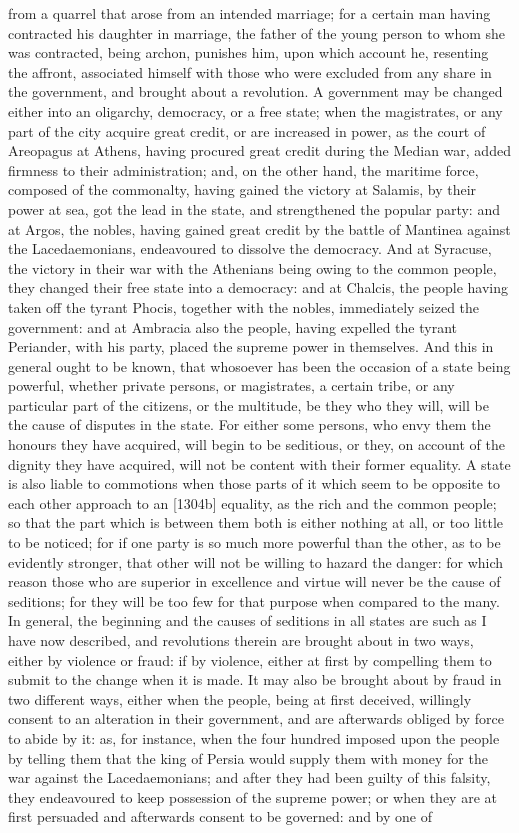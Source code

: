 \documentclass[12pt]{article}
\begin{document}
from a quarrel that arose from an intended marriage; for a certain man having contracted his daughter in marriage, the father of the young person to whom she was contracted, being archon, punishes him, upon which account he, resenting the affront, associated himself with those who were excluded from any share in the government, and brought about a revolution. A government may be changed either into an oligarchy, democracy, or a free state; when the magistrates, or any part of the city acquire great credit, or are increased in power, as the court of Areopagus at Athens, having procured great credit during the Median war, added firmness to their administration; and, on the other hand, the maritime force, composed of the commonalty, having gained the victory at Salamis, by their power at sea, got the lead in the state, and strengthened the popular party: and at Argos, the nobles, having gained great credit by the battle of Mantinea against the Lacedaemonians, endeavoured to dissolve the democracy. And at Syracuse, the victory in their war with the Athenians being owing to the common people, they changed their free state into a democracy: and at Chalcis, the people having taken off the tyrant Phocis, together with the nobles, immediately seized the government: and at Ambracia also the people, having expelled the tyrant Periander, with his party, placed the supreme power in themselves. And this in general ought to be known, that whosoever has been the occasion of a state being powerful, whether private persons, or magistrates, a certain tribe, or any particular part of the citizens, or the multitude, be they who they will, will be the cause of disputes in the state. For either some persons, who envy them the honours they have acquired, will begin to be seditious, or they, on account of the dignity they have acquired, will not be content with their former equality. A state is also liable to commotions when those parts of it which seem to be opposite to each other approach to an [1304b] equality, as the rich and the common people; so that the part which is between them both is either nothing at all, or too little to be noticed; for if one party is so much more powerful than the other, as to be evidently stronger, that other will not be willing to hazard the danger: for which reason those who are superior in excellence and virtue will never be the cause of seditions; for they will be too few for that purpose when compared to the many. In general, the beginning and the causes of seditions in all states are such as I have now described, and revolutions therein are brought about in two ways, either by violence or fraud: if by violence, either at first by compelling them to submit to the change when it is made. It may also be brought about by fraud in two different ways, either when the people, being at first deceived, willingly consent to an alteration in their government, and are afterwards obliged by force to abide by it: as, for instance, when the four hundred imposed upon the people by telling them that the king of Persia would supply them with money for the war against the Lacedaemonians; and after they had been guilty of this falsity, they endeavoured to keep possession of the supreme power; or when they are at first persuaded and afterwards consent to be governed: and by one of 
\end{document}
